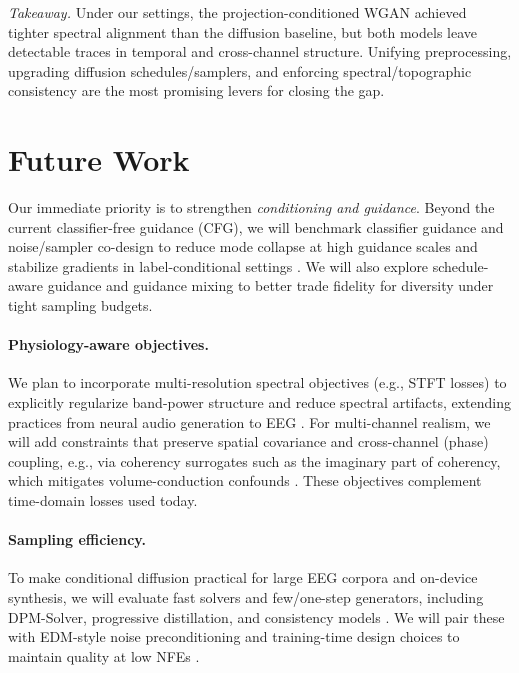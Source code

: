 \documentclass{article}
\begin{document}
\smallskip
\noindent\emph{Takeaway.} Under our settings, the projection-conditioned WGAN achieved tighter spectral alignment than the diffusion baseline, but both models leave detectable traces in temporal and cross-channel structure. Unifying preprocessing, upgrading diffusion schedules/samplers, and enforcing spectral/topographic consistency are the most promising levers for closing the gap.



\section{Future Work}
Our immediate priority is to strengthen \emph{conditioning and guidance}. Beyond the current classifier-free guidance (CFG), we will benchmark classifier guidance and noise/sampler co-design to reduce mode collapse at high guidance scales and stabilize gradients in label-conditional settings \citep{dhariwal2021beatgans,ho2022classifierfree,karras2022elucidatingdesign}. We will also explore schedule-aware guidance and guidance mixing to better trade fidelity for diversity under tight sampling budgets.

\paragraph{Physiology-aware objectives.}
We plan to incorporate multi-resolution spectral objectives (e.g., STFT losses) to explicitly regularize band-power structure and reduce spectral artifacts, extending practices from neural audio generation to EEG \citep{yamamoto2020parallelwavegan}. For multi-channel realism, we will add constraints that preserve spatial covariance and cross-channel (phase) coupling, e.g., via coherency surrogates such as the imaginary part of coherency, which mitigates volume-conduction confounds \citep{nolte2004identifyingtrue}. These objectives complement time-domain losses used today.

\paragraph{Sampling efficiency.}
To make conditional diffusion practical for large EEG corpora and on-device synthesis, we will evaluate fast solvers and few/one-step generators, including DPM-Solver, progressive distillation, and consistency models \citep{liu2022flowstraight,salimans2022progressivedistillation,song2023consistency}. We will pair these with EDM-style noise preconditioning and training-time design choices to maintain quality at low NFEs \citep{karras2022elucidatingdesign}.
\end{document}
